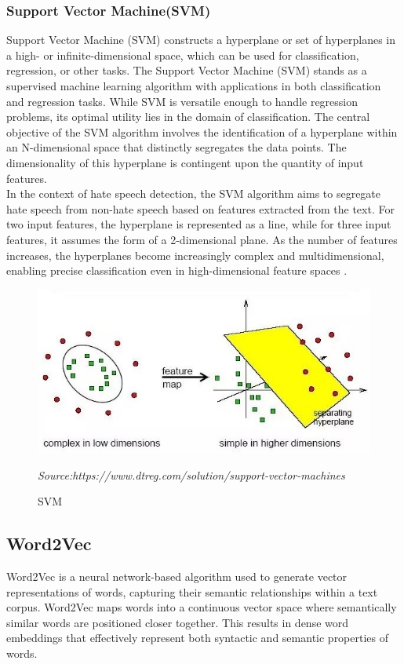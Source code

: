 \subsubsection{Support Vector Machine(SVM)}
Support Vector Machine (SVM) constructs a hyperplane or set of hyperplanes in a high- or infinite-dimensional space, which can be used for classification, regression, or other tasks. The Support Vector Machine (SVM) stands as a supervised machine learning algorithm with applications in both classification and regression tasks. While SVM is versatile enough to handle regression problems, its optimal utility lies in the domain of classification. The central objective of the SVM algorithm involves the identification of a hyperplane within an N-dimensional space that distinctly segregates the data points. The dimensionality of this hyperplane is contingent upon the quantity of input features.\\
In the context of hate speech detection, the SVM algorithm aims to segregate hate speech from non-hate speech based on features extracted from the text. For two input features, the hyperplane is represented as a line, while for three input features, it assumes the form of a 2-dimensional plane. As the number of features increases, the hyperplanes become increasingly complex and multidimensional, enabling precise classification even in high-dimensional feature spaces \cite{pralhad}.
\begin{figure}[h]
\centering
\includegraphics[scale=0.65]{images/svm.png}
\caption{SVM}
\textit{Source:https://www.dtreg.com/solution/support-vector-machines}
\end{figure}

\subsection{Word2Vec}
Word2Vec is a neural network-based algorithm used to generate vector representations of words, capturing their semantic relationships within a text corpus. Word2Vec maps words into a continuous vector space where semantically similar words are positioned closer together. This results in dense word embeddings that effectively represent both syntactic and semantic properties of words.

